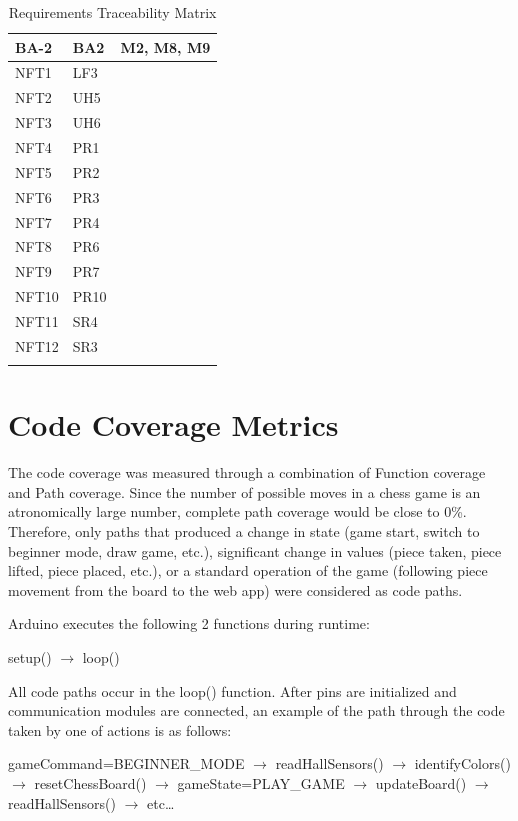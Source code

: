 \documentclass[12pt, titlepage]{article}
\begin{document}
\begin{longtable}{| p{} | p{} | p{}|}
  \hline
  BA-2 & BA2 & M2, M8, M9\\
  \hline
  NFT1 & LF3 &\\
  \hline
  NFT2 & UH5 &\\
  \hline
  NFT3 & UH6 &\\
  \hline
  NFT4 & PR1 &\\
  \hline
  NFT5 & PR2 &\\
  \hline
  NFT6 & PR3 &\\
  \hline
  NFT7 & PR4 &\\
  \hline
  NFT8 & PR6 &\\
  \hline
  NFT9 & PR7 &\\
  \hline
  NFT10 & PR10 &\\
  \hline
  NFT11 & SR4 &\\
  \hline
  NFT12 & SR3 &\\
  \hline
\caption{Requirements Traceability Matrix}
\end{longtable}
		
\section{Code Coverage Metrics}

The code coverage was measured through a combination of Function coverage and Path coverage. Since the number of possible moves in a chess game is an 
atronomically large number, complete path coverage would be close to 0\%. Therefore, only paths that produced a change in state (game start, switch to beginner
mode, draw game, etc.), significant change in values (piece taken, piece lifted, piece placed, etc.), or a standard operation of the game (following piece movement
from the board to the web app) were considered as code paths.

Arduino executes the following 2 functions during runtime:

\begin{center}
  setup() $\rightarrow$ loop()
\end{center}

All code paths occur in the loop() function. After pins are initialized and communication modules are connected, an example of the path through the
code taken by one of actions is as follows:

\begin{center}
  gameCommand=BEGINNER\_MODE $\rightarrow$ readHallSensors() $\rightarrow$ identifyColors() $\rightarrow$ resetChessBoard() 
  $\rightarrow$ gameState=PLAY\_GAME $\rightarrow$ updateBoard() $\rightarrow$ readHallSensors() $\rightarrow$ etc\dots
\end{center}
\end{document}
